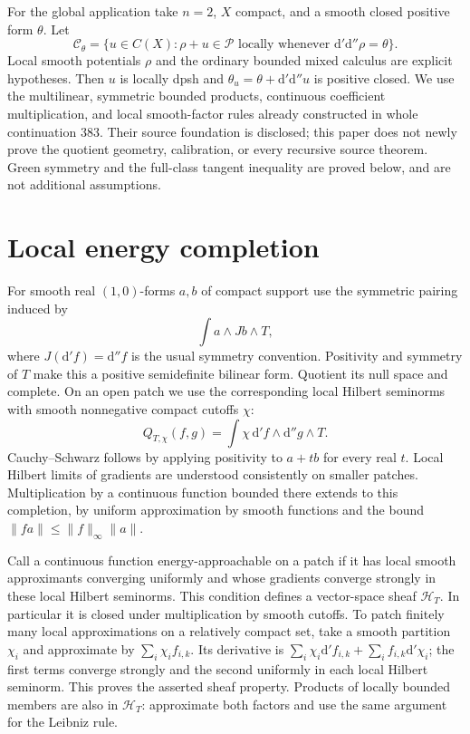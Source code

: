 \documentclass[11pt]{article}
\newcommand{\dd}{\mathrm d'\mathrm d''}
\begin{document}
For the global application take $n=2$, $X$ compact, and a smooth closed
positive form $\theta$. Let
\[
 \mathcal C_\theta=\{u\in C(X):\rho+u\in\mathscr P
       \text{ locally whenever }\dd\rho=\theta\}.
\]
Local smooth potentials $\rho$ and the ordinary bounded mixed calculus
are explicit hypotheses. Then $u$ is locally dpsh and
$\theta_u=\theta+\dd u$ is positive closed. We use the multilinear,
symmetric bounded products, continuous coefficient multiplication, and
local smooth-factor rules already constructed in whole continuation 383.
Their source foundation is disclosed; this paper does not newly prove
the quotient geometry, calibration, or every recursive source theorem.
Green symmetry and the full-class tangent inequality are proved below,
and are not additional assumptions.

\section{Local energy completion}
For smooth real $(1,0)$-forms $a,b$ of compact support use the symmetric
pairing induced by
\[
             \int a\wedge Jb\wedge T,
\]
where $J(\mathrm d'f)=\mathrm d''f$ is the usual symmetry convention.
Positivity and symmetry of $T$ make this a positive semidefinite
bilinear form. Quotient its null space and complete. On an open patch
we use the corresponding local Hilbert seminorms with smooth nonnegative
compact cutoffs $\chi$:
\[
 Q_{T,\chi}(f,g)=\int\chi\,\mathrm d'f\wedge\mathrm d''g\wedge T.
\]
Cauchy--Schwarz follows by applying positivity to $a+tb$ for every
real $t$. Local Hilbert limits of gradients are understood consistently
on smaller patches. Multiplication by a continuous function bounded
there extends to this completion, by uniform approximation by smooth
functions and the bound $\|fa\|\leq\|f\|_\infty\|a\|$.

Call a continuous function energy-approachable on a patch if it has
local smooth approximants converging uniformly and whose gradients
converge strongly in these local Hilbert seminorms. This condition defines
a vector-space sheaf $\mathscr H_T$. In particular it is closed under
multiplication by smooth cutoffs. To patch finitely many local
approximations on a relatively compact set, take a smooth partition
$\chi_i$ and approximate by $\sum_i\chi_i f_{i,k}$. Its derivative is
$\sum_i\chi_i\mathrm d'f_{i,k}+\sum_i f_{i,k}\mathrm d'\chi_i$;
the first terms converge strongly and the second uniformly in each
local Hilbert seminorm. This proves the asserted sheaf property.
Products of locally bounded members are also in $\mathscr H_T$:
approximate both factors and use the same argument for the Leibniz rule.
\end{document}
